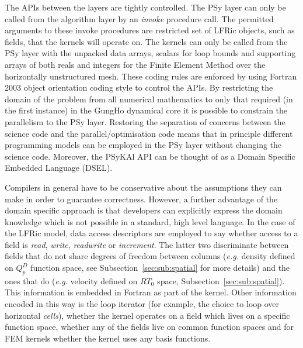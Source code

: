 \documentclass[review,times]{elsarticle}
\begin{document}
The APIs between the layers are tightly controlled. The PSy layer can
only be called from the algorithm layer by an {\em invoke} procedure
call. The permitted arguments to these invoke procedures are restricted
set of LFRic objects, such as fields, that the kernels will operate on. The
kernels can only be called from the PSy layer with the unpacked data
arrays, scalars for loop bounds and supporting arrays of both reals
and integers for the Finite Element Method over the horizontally unstructured mesh.
These coding rules are enforced by using Fortran 2003 object
orientation coding style to control the APIs. By restricting the
domain of the problem from all numerical mathematics to only that
required (in the first instance) in the GungHo dynamical core it is
possible to constrain the parallelism to the PSy layer. Restoring
the separation of concerns between the science code and the
parallel/optimisation code means that in principle different programming
models can be employed in the PSy layer without changing the science
code. Moreover, the PSyKAl API can be thought of as a Domain Specific
Embedded Language (DSEL).

Compilers in general have to be conservative about the assumptions
they can make in order to guarantee correctness. However, a further
advantage of the domain specific approach is that developers can
explicitly express the domain knowledge which is not possible in a
standard, high level language. In the case of the LFRic model, data
access descriptors are employed to say whether access to a field is
{\em read}, {\em write}, {\em readwrite} or {\em increment}. The latter 
two discriminate between fields that do not share degrees 
of freedom between columns ({\em e.g.} density defined on 
$Q_p^D$ function space, see Subsection~\ref{sec:sub:spatial} for more details) 
and the ones that do ({\em e.g.} velocity defined on $RT_0$ space, 
Subsection~\ref{sec:sub:spatial}). This information is embedded in
Fortran as part of the kernel. Other information encoded in this way
is the loop iterator (for example, the choice to loop over horizontal {\em cells}), whether the kernel
operates on a field which lives on a specific function space, whether
any of the fields live on common function spaces and for FEM kernels
whether the kernel uses any basis functions. 
\end{document}

